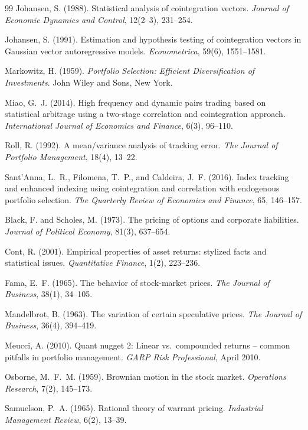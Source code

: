 \documentclass[12pt,a4paper]{article}
\begin{document}
\begin{thebibliography}{99}
Johansen, S. (1988).
\newblock Statistical analysis of cointegration vectors.
\newblock \emph{Journal of Economic Dynamics and Control}, 12(2--3), 231--254.

Johansen, S. (1991).
\newblock Estimation and hypothesis testing of cointegration vectors in
  Gaussian vector autoregressive models.
\newblock \emph{Econometrica}, 59(6), 1551--1581.

Markowitz, H. (1959).
\newblock \emph{Portfolio Selection: Efficient Diversification of Investments}.
\newblock John Wiley and Sons, New York.

Miao, G.~J. (2014).
\newblock High frequency and dynamic pairs trading based on statistical
  arbitrage using a two-stage correlation and cointegration approach.
\newblock \emph{International Journal of Economics and Finance}, 6(3), 96--110.

Roll, R. (1992).
\newblock A mean/variance analysis of tracking error.
\newblock \emph{The Journal of Portfolio Management}, 18(4), 13--22.

Sant'Anna, L.~R., Filomena, T.~P., and Caldeira, J.~F. (2016).
\newblock Index tracking and enhanced indexing using cointegration and
  correlation with endogenous portfolio selection.
\newblock \emph{The Quarterly Review of Economics and Finance}, 65, 146--157.

Black, F. and Scholes, M. (1973).
\newblock The pricing of options and corporate liabilities.
\newblock \emph{Journal of Political Economy}, 81(3), 637--654.

Cont, R. (2001).
\newblock Empirical properties of asset returns: stylized facts and
  statistical issues.
\newblock \emph{Quantitative Finance}, 1(2), 223--236.

Fama, E.~F. (1965).
\newblock The behavior of stock-market prices.
\newblock \emph{The Journal of Business}, 38(1), 34--105.

Mandelbrot, B. (1963).
\newblock The variation of certain speculative prices.
\newblock \emph{The Journal of Business}, 36(4), 394--419.

Meucci, A. (2010).
\newblock Quant nugget 2: Linear vs.\ compounded returns -- common pitfalls
  in portfolio management.
\newblock \emph{GARP Risk Professional}, April 2010.

Osborne, M.~F.~M. (1959).
\newblock Brownian motion in the stock market.
\newblock \emph{Operations Research}, 7(2), 145--173.

Samuelson, P.~A. (1965).
\newblock Rational theory of warrant pricing.
\newblock \emph{Industrial Management Review}, 6(2), 13--39.

\end{thebibliography}
\end{document}
